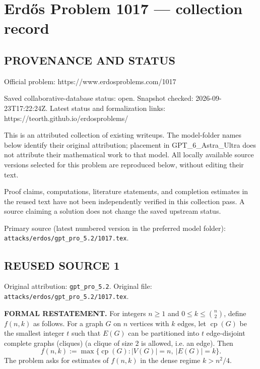 \section*{Erd\H{o}s Problem 1017 --- collection record}

\subsection*{PROVENANCE AND STATUS}
Official problem: https://www.erdosproblems.com/1017

Saved collaborative-database status: open.
Snapshot checked: 2026-09-23T17:22:24Z.
Latest status and formalization links: https://teorth.github.io/erdosproblems/

This is an attributed collection of existing writeups. The model-folder names below identify their original attribution; placement in GPT\_6\_Astra\_Ultra does not attribute their mathematical work to that model. All locally available source versions selected for this problem are reproduced below, without editing their text.

Proof claims, computations, literature statements, and completion estimates in the reused text have not been independently verified in this collection pass. A source claiming a solution does not change the saved upstream status.

Primary source (latest numbered version in the preferred model folder): \texttt{attacks/erdos/gpt\_pro\_5.2/1017.tex}.

\subsection*{REUSED SOURCE 1}
Original attribution: \texttt{gpt\_pro\_5.2}.
Original file: \texttt{attacks/erdos/gpt\_pro\_5.2/1017.tex}.


\noindent\textbf{FORMAL RESTATEMENT.}
For integers $n\ge 1$ and $0\le k\le \binom{n}{2}$, define $f(n,k)$ as follows.
For a graph $G$ on $n$ vertices with $k$ edges, let $\operatorname{cp}(G)$ be the smallest integer $t$ such that $E(G)$ can be partitioned into $t$ edge-disjoint complete graphs (cliques) (a clique of size $2$ is allowed, i.e. an edge).
Then
\[
f(n,k):=\max\{\operatorname{cp}(G): |V(G)|=n,\ |E(G)|=k\}.
\]
The problem asks for estimates of $f(n,k)$ in the dense regime $k>n^2/4$.

